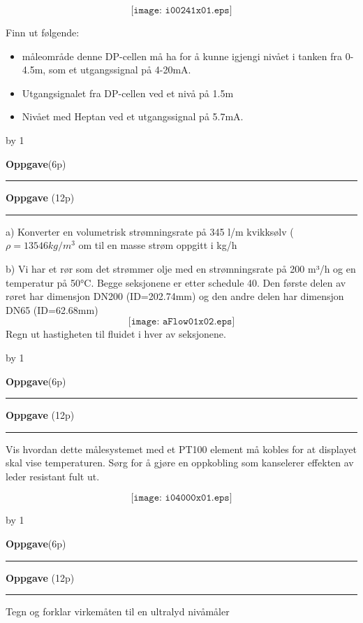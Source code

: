 \documentclass[12pt,a4paper]{article}
\def\oppgave{
            \advance\questnum by 1
	    \ifthenelse{\questnum>0\AND \questnum<9}
	    {
                \vskip 1cm
		\textbf{Oppgave}\hskip 5pt\the\questnum \hfill \hfill(6p)
		\vskip 3pt
		\hrule
	\vskip 0.5cm}
	{
                \vskip 1cm
		\textbf{Oppgave}\hskip 5pt \the\questnum \hfill \hfill(12p)
		\vskip 3pt \hrule \vskip 0.5cm }

		}
\begin{document}
$$\texttt{[image: i00241x01.eps]}$$

Finn ut følgende: 

\begin{itemize}
	\item  måleområde denne DP-cellen må ha for å kunne igjengi nivået i tanken fra 0-4.5m, som et utgangssignal på 4-20mA. 
	\item{} Utgangsignalet fra DP-cellen ved et nivå på 1.5m 
	\item{} Nivået med Heptan ved et utgangssignal på 5.7mA.
\end{itemize}
\newpage
\oppgave{} 
\vskip 2.5pt 
a) Konverter en volumetrisk strømningsrate på 345 l/m kvikksølv ($\rho=13546 kg/m^3$ om til en masse strøm oppgitt i kg/h
\vskip 2.5pt 
\vskip 0.5cm 
b) Vi har et rør som det strømmer olje med en strømningsrate på 200 m³/h og en temperatur på 50°C. Begge seksjonene er etter schedule 40.  Den første delen av røret har dimensjon DN200 (ID=202.74mm) og den andre delen har dimensjon DN65 (ID=62.68mm)
$$\texttt{[image: aFlow01x02.eps]}$$
Regn ut hastigheten til fluidet i hver av seksjonene. 
\vskip 2.5pt 
\newpage
\oppgave{} 
Vis hvordan dette målesystemet med et PT100 element må kobles for at displayet skal vise temperaturen. Sørg for å gjøre en  oppkobling som kanselerer effekten av leder resistant fult ut. 

$$\texttt{[image: i04000x01.eps]}$$
\newpage
\oppgave{} 
Tegn og forklar virkemåten til en ultralyd nivåmåler
\end{document}
